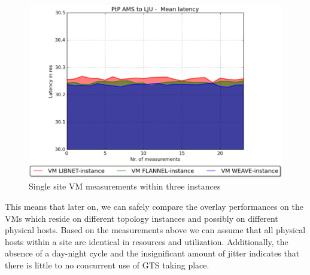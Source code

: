 \begin{figure}[H]
   \centering
   \includegraphics[scale=0.6]{img/ALL_AMS_LJU_MEANLAT.png}
   \caption{Single site VM measurements within three instances }
   \label{fig:ALL_AMS_LJU_MEANLAT}
\end{figure}

This means that later on, we can safely compare the overlay performances on the VMs which reside on different topology instances and possibly on different physical hosts. Based on the measurements above we can assume that all physical hosts within a site are identical in resources and utilization. Additionally, the absence of a day-night cycle and the insignificant amount of jitter indicates that there is little to no concurrent use of GTS taking place.

